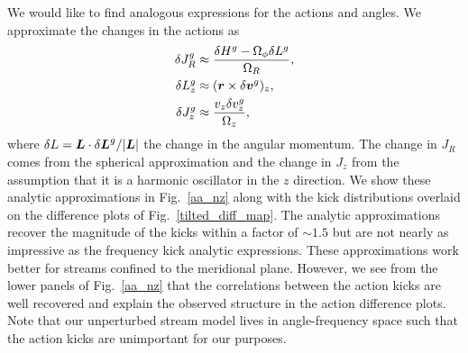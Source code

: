 \documentclass[useAMS,usenatbib,fleqn,a4paper]{mn2e}
\newcommand{\bs}[1]{\bmath{#1}}
\begin{document}
We would like to find analogous expressions for the actions and angles. We approximate the changes in the actions as
\begin{equation}
\begin{split}
\delta J^g_R &\approx \frac{\delta H^g - \Omega_\phi\delta L^g}{\Omega_R},\\
\delta L^g_z &\approx (\bs{r}\times\delta\bs{v}^g)_z,\\
\delta J^g_z &\approx \frac{v_z \delta v^g_z}{\Omega_z},
\end{split}
\label{dJ_an}
\end{equation}
where $\delta L = \bs{L}\cdot\delta\bs{L}^g/|\bs{L}|$ the change in the angular momentum. The change in $J_R$ comes from the spherical approximation and the change in $J_z$ from the assumption that it is a harmonic oscillator in the $z$ direction. We show these analytic approximations in Fig.~\ref{aa_nz} along with the kick distributions overlaid on the difference plots of Fig.~\ref{tilted_diff_map}. The analytic approximations recover the magnitude of the kicks within a factor of $\sim1.5$ but are not nearly as impressive as the frequency kick analytic expressions. These approximations work better for streams confined to the meridional plane. However, we see from the lower panels of Fig.~\ref{aa_nz} that the correlations between the action kicks are well recovered and explain the observed structure in the action difference plots. Note that our unperturbed stream model lives in angle-frequency space such that the action kicks are unimportant for our purposes.
\end{document}

